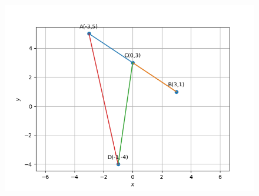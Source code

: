 \documentclass[12pt]{article}
\begin{document}
\begin{enumerate}
\begin{figure}[!h]
	\begin{center} 
	    \includegraphics[width=\columnwidth]{figs/quad2}
	\end{center}
\caption{}
\label{fig:Fig2}
\end{figure}
	

\end{enumerate}
\end{document}
